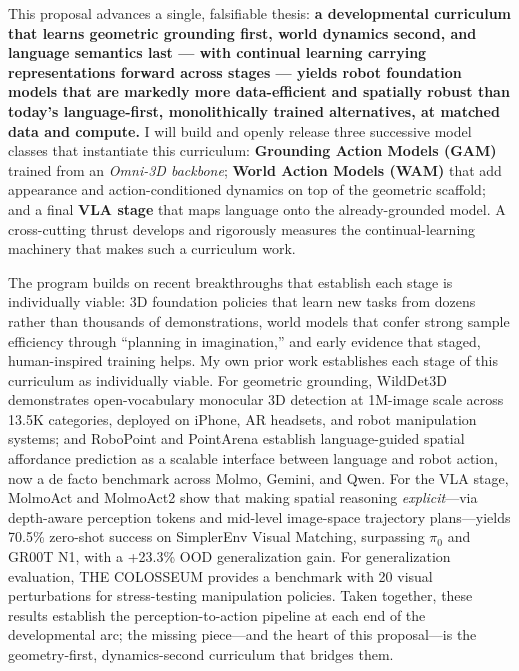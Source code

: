 \documentclass[11pt]{article}
\begin{document}
This proposal advances a single, falsifiable thesis: \textbf{a developmental curriculum that learns geometric grounding first, world dynamics second, and language semantics last --- with continual learning carrying representations forward across stages --- yields robot foundation models that are markedly more data-efficient and spatially robust than today's language-first, monolithically trained alternatives, at matched data and compute.} I will build and openly release three successive model classes that instantiate this curriculum: \textbf{Grounding Action Models (GAM)} trained from an \emph{Omni-3D backbone}; \textbf{World Action Models (WAM)} that add appearance and action-conditioned dynamics on top of the geometric scaffold; and a final \textbf{VLA stage} that maps language onto the already-grounded model. A cross-cutting thrust develops and rigorously measures the continual-learning machinery that makes such a curriculum work.

The program builds on recent breakthroughs that establish each stage is individually viable: 3D foundation policies that learn new tasks from dozens rather than thousands of demonstrations,\cite{fp3,lift3d} world models that confer strong sample efficiency through ``planning in imagination,''\cite{worldmodels,dreamerv3,tdmpc2,dinowm,vjepa2} and early evidence that staged, human-inspired training helps. My own prior work establishes each stage of this curriculum as individually viable. For geometric grounding, WildDet3D\cite{wilddet3d} demonstrates open-vocabulary monocular 3D detection at 1M-image scale across 13.5K categories, deployed on iPhone, AR headsets, and robot manipulation systems; and RoboPoint\cite{robopoint} and PointArena\cite{pointarena} establish language-guided spatial affordance prediction as a scalable interface between language and robot action, now a de facto benchmark across Molmo, Gemini, and Qwen. For the VLA stage, MolmoAct\cite{molmoact} and MolmoAct2\cite{molmoact2} show that making spatial reasoning \emph{explicit}---via depth-aware perception tokens and mid-level image-space trajectory plans---yields 70.5\% zero-shot success on SimplerEnv Visual Matching, surpassing $\pi_0$\cite{pi0} and GR00T N1,\cite{groot} with a +23.3\% OOD generalization gain. For generalization evaluation, THE COLOSSEUM\cite{colosseum} provides a benchmark with 20 visual perturbations for stress-testing manipulation policies. Taken together, these results establish the perception-to-action pipeline at each end of the developmental arc; the missing piece---and the heart of this proposal---is the geometry-first, dynamics-second curriculum that bridges them.
\end{document}
